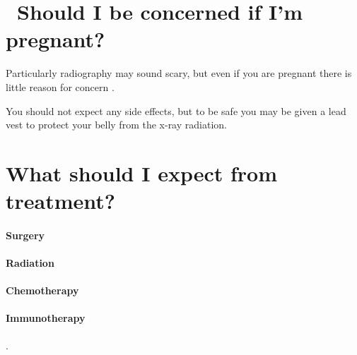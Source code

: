 \documentclass[12pt,nofoldmark,notumble]{leaflet}
\begin{document}
\section{\faFemale\ Should I be concerned if I'm pregnant?}
Particularly radiography may sound scary, but even if you are pregnant there is little reason for concern \cite{ACOG2017, AmFam1999}.

You should not expect any side effects, but to be safe you may be given a lead vest to protect your belly from the x-ray radiation.
\section{What should I expect from treatment?}


\paragraph{Surgery}
\paragraph{Radiation}
\paragraph{Chemotherapy}
\paragraph{Immunotherapy}.
\clearpage
\clearpage

\end{document}
